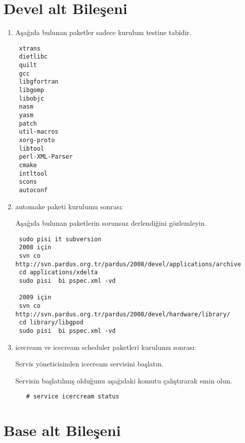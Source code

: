 \documentclass[a4paper,10pt]{article}
\begin{document}
\section{Devel alt Bileşeni}
\begin{enumerate}
 \item Aşağıda bulunan paketler sadece kurulum testine tabidir.
\begin{verbatim}
 xtrans
 dietlibc 
 quilt
 gcc
 libgfortran
 libgomp
 libobjc
 nasm
 yasm
 patch
 util-macros
 xorg-proto
 libtool
 perl-XML-Parser
 cmake
 intltool
 scons
 autoconf
\end{verbatim}
\item automake paketi kurulumu sonrası:

Aşağıda bulunan paketlerin sorunsuz derlendiğini gözlemleyin.
\begin{verbatim}
 sudo pisi it subversion
 2008 için
 svn co http://svn.pardus.org.tr/pardus/2008/devel/applications/archive
 cd applications/xdelta
 sudo pisi  bi pspec.xml -vd

 2009 için
 svn co http://svn.pardus.org.tr/pardus/2008/devel/hardware/library/
 cd library/libgpod
 sudo pisi  bi pspec.xml -vd

\end{verbatim}

 \item icecream ve icecream scheduler paketleri kurulumu sonrası:

Servis yöneticisinden icecream servisini başlatın.

Servisin başlatılmış olduğunu aşağıdaki komutu çalıştırarak emin olun.
 \begin{verbatim}
   # service icercream status
 \end{verbatim}

\end{enumerate}


\section{Base alt Bileşeni}
\end{document}

